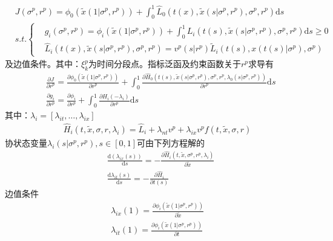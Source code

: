             \begin{align*}
            & J(\sigma^p,r^p)= \phi_0(\tilde{x}(1|\sigma^p,r^p))+\int_0^1\hat{L}_0(t(x),\tilde{x}(s|\sigma^p,r^p),\sigma^p,r^p)\mathrm{d}s\\
            & s.t.\left\{
            \begin{aligned}
            & g_i(\sigma^p,r^p) = \phi_i(\tilde{x}(1|\sigma^p,r^p))+\int_0^1L_i(t(s),\tilde{x}(s|\sigma^p,r^p),\sigma^p,r^p)\mathrm{d}s \geqslant 0\\
            & \hat{L}_i(t(x),\tilde{x}(s|\sigma^p,r^p),\sigma^p,r^p) = v^p(s|r^p)\tilde{L}_i(t(s),x(t(s)|\sigma^p),\sigma^p)
            \end{aligned}
            \right.
            \end{align*}
            及边值条件。其中：$\xi_k^p$为时间分段点。指标泛函及约束函数关于$r^p$求导有
            \begin{align*}
            & \frac{\partial J}{\partial r^p} = \frac{\partial \phi_0(\tilde{x}(1|\sigma^p,r^p))}{\partial r^p}+\int_0^1\frac{\partial \hat{H}_0(t(s),\tilde{x}(s|\sigma^p,r^p),\sigma^p,r^p,\lambda_0(s|\sigma^p,r^p))}{\partial r^p}\mathrm{d}s\\
            & \frac{\partial g_i}{\partial r^p} = \frac{\partial \phi_i}{\partial r^p}+\int_0^1\frac{\partial H_i(-\lambda_i)}{\partial r^p}\mathrm{d}s
            \end{align*}
            其中：$\lambda_i = [\lambda_{it},\dots,\lambda_{ix}]$
            \begin{align*}
            \hat{H}_i(t,\tilde{x},\sigma,r,\lambda_i) = \hat{L}_i+\lambda_{nt}v^p+\lambda_{ix}v^pf(t,\tilde{x},\sigma,r)
            \end{align*}
            协状态变量$\lambda_i(s|\sigma^p,r^p),s\in [0,1]$可由下列方程解的
            \begin{align*}
            & \frac{\mathrm{d}(\lambda_{ix}(s))}{\mathrm{d}s} = -\frac{\partial \hat{H}_i(t,\tilde{x},\sigma^p,r^p,\lambda_i)}{\partial \tilde{x}}\\
            & \frac{\mathrm{d}\lambda_{it}(s)}{\mathrm{d}s} = -\frac{\partial \hat{H}_i}{\partial t(s)}
            \end{align*}
            边值条件
            \begin{align*}
            \lambda_{ix}(1) = \frac{\partial \phi_i(\tilde{x}(1|\sigma^p,r^p))}{\partial \tilde{x}}\\
            \lambda_{it}(1) = \frac{\partial \phi_i(\tilde{x}(1|\sigma^p,r^p))}{\partial t}
            \end{align*}
